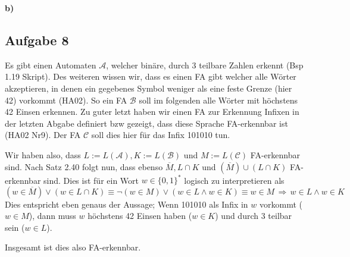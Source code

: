 \documentclass[a4paper,graphics,11pt]{article}
\newcommand{\aufgabe}[1]{\subsection*{Aufgabe #1}}
\begin{document}
\textbf{b)}\\


\newpage
\aufgabe{8}
Es gibt einen Automaten $\mathcal{A}$, welcher binäre, durch 3 teilbare Zahlen erkennt (Bsp 1.19 Skript).
Des weiteren wissen wir, dass es einen FA gibt welcher alle Wörter akzeptieren,
in denen ein gegebenes Symbol weniger als eine feste Grenze (hier 42) vorkommt (HA02). So ein FA $\mathcal{B}$
soll im folgenden alle Wörter mit höchstens 42 Einsen erkennen.
Zu guter letzt haben wir einen FA zur Erkennung Infixen in der letzten Abgabe definiert bzw gezeigt, dass diese Sprache FA-erkennbar ist (HA02 Nr9). Der FA $\mathcal{C}$ soll dies hier für das Infix 101010 tun.

Wir haben also, dass $L := L(\mathcal{A}), K := L(\mathcal{B})$ und $M := L(\mathcal{C})$ FA-erkennbar sind.
Nach Satz 2.40 folgt nun, dass ebenso $\overline{M}, L \cap K$ und $(\overline{M}) \cup (L \cap K)$ FA-erkennbar
sind.
Dies ist für ein Wort $w \in \{0, 1\}^*$ logisch zu interpretieren als
$$
    (w \in \overline{M}) \lor (w \in L \cap K)
    \equiv \lnot (w \in M) \lor (w \in L \land w \in K)
    \equiv w \in M \,\Longrightarrow\, w \in L \land w \in K
$$
Dies entspricht eben genaus der Aussage; Wenn 101010 als Infix in $w$ vorkommt ($w \in M$), dann muss 
$w$ höchstens 42 Einsen haben ($w \in K$) und durch 3 teilbar sein ($w \in L$).

Insgesamt ist dies also FA-erkennbar.
\end{document}
